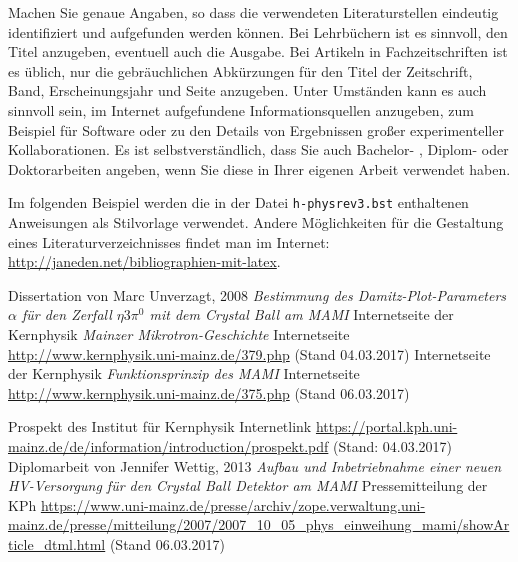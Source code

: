 \documentclass[a4paper,11pt,oneside,final,german,openbib,pdftex]{scrbook}
\begin{document}
\begin{appendix}
Machen Sie genaue Angaben, so dass die verwendeten Literaturstellen 
eindeutig identifiziert und aufgefunden werden k\"onnen.
Bei Lehrb\"uchern \cite{Weinberg:1995mt} ist es sinnvoll, 
den Titel anzugeben, eventuell auch die Ausgabe. Bei Artikeln in 
Fachzeitschriften \cite{Moch:2001zr} ist es \"ublich, nur die 
gebr\"auchlichen Abk\"urzungen f\"ur den Titel der Zeitschrift, Band, 
Erscheinungsjahr und Seite anzugeben. Unter Umst\"anden kann es auch 
sinnvoll sein, im Internet aufgefundene Informationsquellen anzugeben, 
zum Beispiel f\"ur Software \cite{LoopTools} oder zu den Details von 
Ergebnissen gro{\ss}er experimenteller Kollaborationen. Es ist 
selbstverst\"andlich, dass Sie auch Bachelor- \cite{BA:Freund}, 
Diplom- oder Doktorarbeiten angeben, wenn Sie diese in Ihrer eigenen 
Arbeit verwendet haben.
\medskip

Im folgenden Beispiel werden die in der Datei {\tt h-physrev3.bst} 
enthaltenen Anweisungen als Stilvorlage verwendet. Andere 
M\"oglichkeiten f\"ur die Gestaltung eines Literaturverzeichnisses 
findet man im Internet: \url{http://janeden.net/bibliographien-mit-latex}.

\renewcommand{\bibname}{\bfont Literaturverzeichnis} 

\begin{thebibliography}{99}
 Dissertation von Marc Unverzagt,  2008 {\em Bestimmung des Damitz-Plot-Parameters $\alpha$ für den Zerfall $ \eta 3\pi^{0} $ mit dem Crystal Ball am MAMI}
 Internetseite der Kernphysik {\em Mainzer Mikrotron-Geschichte} Internetseite \url{http://www.kernphysik.uni-mainz.de/379.php} (Stand 04.03.2017)
 Internetseite der Kernphysik {\em Funktionsprinzip des MAMI} Internetseite \url{http://www.kernphysik.uni-mainz.de/375.php} (Stand 06.03.2017)

 Prospekt des Institut für Kernphysik Internetlink \url{https://portal.kph.uni-mainz.de/de/information/introduction/prospekt.pdf} (Stand: 04.03.2017)
 Diplomarbeit von Jennifer Wettig, 2013 {\em Aufbau und Inbetriebnahme einer neuen HV-Versorgung für den Crystal Ball Detektor am MAMI}
 Pressemitteilung der KPh \url{https://www.uni-mainz.de/presse/archiv/zope.verwaltung.uni-mainz.de/presse/mitteilung/2007/2007_10_05_phys_einweihung_mami/showArticle_dtml.html} (Stand 06.03.2017)













\end{thebibliography}
\end{appendix}
\end{document}
